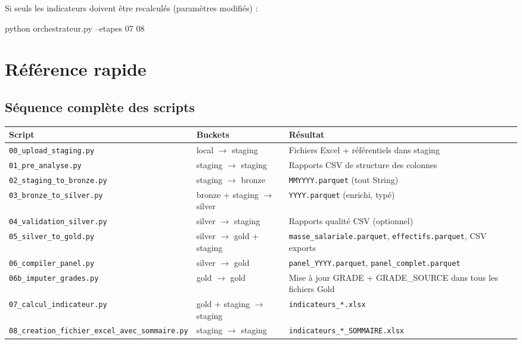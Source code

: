 \documentclass[12pt,a4paper,french]{report}
\begin{document}
Si seuls les indicateurs doivent être recalculés (paramètres modifiés) :
\begin{codebox}[]
python orchestrateur.py --etapes 07 08
\end{codebox}

\chapter{Référence rapide}

\section{Séquence complète des scripts}

\begin{tabularx}{\textwidth}{llX}
  \toprule
  \textbf{Script} & \textbf{Buckets} & \textbf{Résultat} \\
  \midrule
  \texttt{00\_upload\_staging.py} &
    local $\rightarrow$ staging &
    Fichiers Excel + référentiels dans staging \\
  \texttt{01\_pre\_analyse.py} &
    staging $\rightarrow$ staging &
    Rapports CSV de structure des colonnes \\
  \texttt{02\_staging\_to\_bronze.py} &
    staging $\rightarrow$ bronze &
    \texttt{MMYYYY.parquet} (tout String) \\
  \texttt{03\_bronze\_to\_silver.py} &
    bronze + staging $\rightarrow$ silver &
    \texttt{YYYY.parquet} (enrichi, typé) \\
  \texttt{04\_validation\_silver.py} &
    silver $\rightarrow$ staging &
    Rapports qualité CSV (optionnel) \\
  \texttt{05\_silver\_to\_gold.py} &
    silver $\rightarrow$ gold + staging &
    \texttt{masse\_salariale.parquet},
    \texttt{effectifs.parquet}, CSV exports \\
  \texttt{06\_compiler\_panel.py} &
    silver $\rightarrow$ gold &
    \texttt{panel\_YYYY.parquet},
    \texttt{panel\_complet.parquet} \\
  \texttt{06b\_imputer\_grades.py} &
    gold $\rightarrow$ gold &
    Mise à jour GRADE + GRADE\_SOURCE dans tous les fichiers Gold \\
  \texttt{07\_calcul\_indicateur.py} &
    gold + staging $\rightarrow$ staging &
    \texttt{indicateurs\_*.xlsx} \\
  \texttt{08\_creation\_fichier\_excel\_avec\_sommaire.py} &
    staging $\rightarrow$ staging &
    \texttt{indicateurs\_*\_SOMMAIRE.xlsx} \\
  \bottomrule
\end{tabularx}
\end{document}
